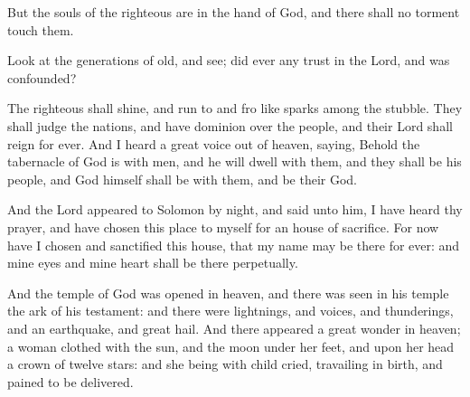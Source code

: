 \begin{multicols}{2}
	But the souls of the righteous are in the hand of God, and there shall no torment touch them.\par
	Look at the generations of old, and see; did ever any trust in the Lord, and was confounded? 
	\par
	The righteous shall shine, and run to and fro like sparks among the stubble. They shall judge the nations, and have dominion over the people, and their Lord shall reign for ever. 
	And I heard a great voice out of heaven, saying, Behold the tabernacle of God is with men, and he will dwell with them, and they shall be his people, and God himself shall be with them, and be their God.
	\par
	And the Lord appeared to Solomon by night, and said unto him, I have heard thy prayer, and have chosen this place to myself for an house of sacrifice. For now have I chosen and sanctified this house, that my name may be there for ever: and mine eyes and mine heart shall be there perpetually. 
	\par
	And the temple of God was opened in heaven, and there was seen in his temple the ark of his testament: and there were lightnings, and voices, and thunderings, and an earthquake, and great hail. And there appeared a great wonder in heaven; a woman clothed with the sun, and the moon under her feet, and upon her head a crown of twelve stars: and she being with child cried, travailing in birth, and pained to be delivered. 
\end{multicols}
